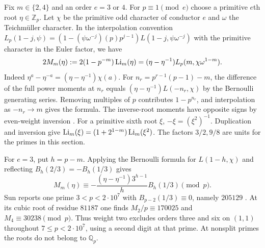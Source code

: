 Fix $m\in\{2,4\}$ and an order $e=3$ or $4$. For $p\equiv1\pmod e$
choose a primitive $e$th root $\eta\in\mathbb Z_p$. Let $\chi$ be
the primitive odd character of conductor $e$ and $\omega$ the
Teichm\"uller character. In the interpolation convention
$L_p(1-j,\psi)=(1-(\psi\omega^{-j})(p)p^{j-1})L(1-j,\psi\omega^{-j})$
with the primitive character in the Euler factor, we have
\[
 2M_m(\eta):=2(1-p^{-m})\operatorname{Li}_m(\eta)
 =(\eta-\eta^{-1})L_p(m,\chi\omega^{1-m}).
\]
Indeed $\eta^a-\eta^{-a}=(\eta-\eta^{-1})\chi(a)$. For
$n_r=p^{r-1}(p-1)-m$, the difference of the full power moments at
$n_r$ equals $(\eta-\eta^{-1})L(-n_r,\chi)$ by the Bernoulli
generating series. Removing multiples of $p$ contributes
$1-p^{n_r}$, and interpolation as $-n_r\to m$ gives the formula.
The inverse-root moments have opposite signs by even-weight inversion
\cite[\S\S VI--VII]{Coleman}. For a primitive sixth root $\xi$,
$-\xi=(\xi^2)^{-1}$. Duplication and inversion give
$\operatorname{Li}_m(\xi)=(1+2^{1-m})\operatorname{Li}_m(\xi^2)$.
The factors $3/2,9/8$ are units for the primes in this section.

For $e=3$, put $h=p-m$. Applying the Bernoulli formula for
$L(1-h,\chi)$ and reflecting $B_h(2/3)=-B_h(1/3)$ gives
\[
 M_m(\eta)\equiv
 -\frac{(\eta-\eta^{-1})3^{h-1}}{h}B_h(1/3)\pmod p .
\]
Sun reports one prime $3<p<2\cdot10^7$ with
$B_{p-2}(1/3)\equiv0$, namely $205129$ \cite[Remark~17]{Sun}.
At its cubic root of residue $81187$ one finds
$M_2/p\equiv170025$ and $M_4\equiv30238\pmod p$.
Thus weight two excludes orders three and six on $(1,1)$ throughout
$7\le p<2\cdot10^7$, using a second digit at that prime. At nonsplit
primes the roots do not belong to $\mathbb Q_p$.

